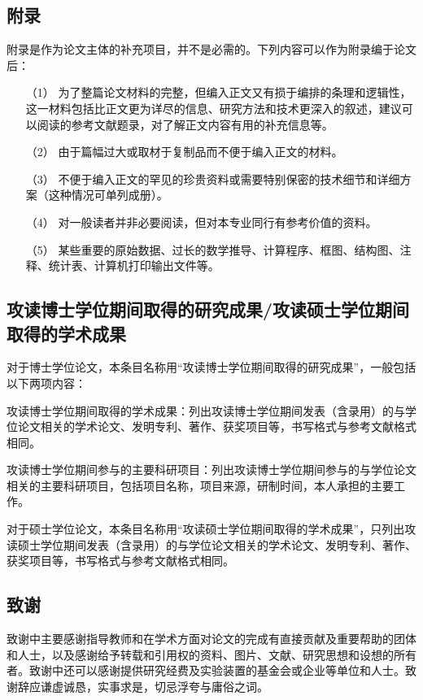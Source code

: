 \subsection{附录}
附录是作为论文主体的补充项目，并不是必需的。下列内容可以作为附录编于论文后：
\begin{enumerate}
    \item [（1）] 为了整篇论文材料的完整，但编入正文又有损于编排的条理和逻辑性，这一材料包括比正文更为详尽的信息、研究方法和技术更深入的叙述，建议可以阅读的参考文献题录，对了解正文内容有用的补充信息等。
    \item [（2）] 由于篇幅过大或取材于复制品而不便于编入正文的材料。
    \item [（3）] 不便于编入正文的罕见的珍贵资料或需要特别保密的技术细节和详细方案（这种情况可单列成册）。
    \item [（4）] 对一般读者并非必要阅读，但对本专业同行有参考价值的资料。
    \item [（5）] 某些重要的原始数据、过长的数学推导、计算程序、框图、结构图、注释、统计表、计算机打印输出文件等。
\end{enumerate}

\subsection{攻读博士学位期间取得的研究成果/攻读硕士学位期间取得的学术成果}
对于博士学位论文，本条目名称用“攻读博士学位期间取得的研究成果”，一般包括以下两项内容：

攻读博士学位期间取得的学术成果：列出攻读博士学位期间发表（含录用）的与学位论文相关的学术论文、发明专利、著作、获奖项目等，书写格式与参考文献格式相同。

攻读博士学位期间参与的主要科研项目：列出攻读博士学位期间参与的与学位论文相关的主要科研项目，包括项目名称，项目来源，研制时间，本人承担的主要工作。

对于硕士学位论文，本条目名称用“攻读硕士学位期间取得的学术成果”，只列出攻读硕士学位期间发表（含录用）的与学位论文相关的学术论文、发明专利、著作、获奖项目等，书写格式与参考文献格式相同。

\subsection{致谢}
致谢中主要感谢指导教师和在学术方面对论文的完成有直接贡献及重要帮助的团体和人士，以及感谢给予转载和引用权的资料、图片、文献、研究思想和设想的所有者。致谢中还可以感谢提供研究经费及实验装置的基金会或企业等单位和人士。致谢辞应谦虚诚恳，实事求是，切忌浮夸与庸俗之词。